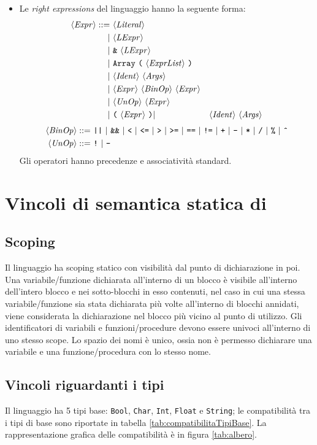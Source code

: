 \begin{itemize}
	\item Le \emph{right expressions} del linguaggio hanno la seguente forma:
	\begin{align*}
	\langle \mathit{Expr} \rangle ::=\ &\langle \mathit{Literal} \rangle\\
	|\ &\langle \mathit{LExpr} \rangle\\
	|\ &\texttt{\&}\ \langle \mathit{LExpr} \rangle\\
	|\ &\texttt{Array}\ \texttt{(}\ \langle \mathit{ExprList} \rangle\ \texttt{)}\\
	|\ &\langle \mathit{Ident} \rangle\ \langle \mathit{Args} \rangle\\
	|\ &\langle \mathit{Expr} \rangle\ \langle \mathit{BinOp} \rangle\ \langle \mathit{Expr} \rangle\\
	|\ &\langle \mathit{UnOp} \rangle\ \langle \mathit{Expr} \rangle\\
	|\ &\texttt{(}\ \langle \mathit{Expr} \rangle\ \texttt{)}
	|\ &\langle \mathit{Ident} \rangle\ \langle \mathit{Args} \rangle\\
	\end{align*}
	\begin{align*}
	\token{BinOp} ::=\ 
	&\texttt{||}\ |\ \texttt{\&\&}\ |\ \texttt{<}\ |\ \texttt{<=}\ |\ \texttt{>}\ |\ \texttt{>=}\ |\ \texttt{==}\ |\  \texttt{!=}\ 
	|\ \texttt{+}\ |\ \texttt{-}\ |\ \texttt{*}\ |\ \texttt{/}\ |\ \texttt{\%}\ |\ \texttt{\^{}} \\
	\token{UnOp} ::=\ &\texttt{!}\ |\ \texttt{-}
	\end{align*}
	Gli operatori hanno precedenze e associatività standard.
\end{itemize}

\section{Vincoli di semantica statica di \SBF}
\subsection*{Scoping}
Il linguaggio ha scoping statico con visibilità dal punto di dichiarazione in poi. Una variabile/funzione dichiarata all'interno di un blocco è visibile all'interno dell'intero blocco e nei sotto-blocchi in esso contenuti, nel caso in cui una stessa variabile/funzione sia stata dichiarata più volte all'interno di blocchi annidati, viene considerata la dichiarazione nel blocco più vicino al punto di utilizzo.
Gli identificatori di variabili e funzioni/procedure devono essere univoci all'interno di uno stesso scope. Lo spazio dei nomi è unico, ossia non è permesso dichiarare una variabile e una funzione/procedura con lo stesso nome. 

\subsection*{Vincoli riguardanti i tipi}
Il linguaggio ha 5 tipi base: \texttt{Bool}, \texttt{Char}, \texttt{Int}, \texttt{Float} e \texttt{String}; le compatibilità tra i tipi di base sono riportate in tabella \ref{tab:compatibilitaTipiBase}. La rappresentazione grafica delle compatibilità è in figura \ref{tab:albero}.

